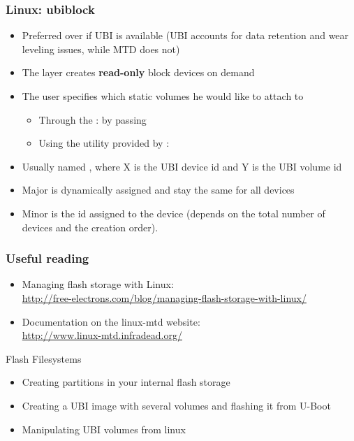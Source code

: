 \begin{frame}
  \frametitle{Linux: ubiblock}
  \begin{itemize}
  \item Preferred over  if UBI is available (UBI accounts
    for data retention and wear leveling issues, while MTD does not)
  \item The  layer creates {\bf read-only} block devices
    on demand
  \item The user specifies which static volumes he would like to attach
    to 
    \begin{itemize}
    \item Through the : by passing
    \item Using the  utility provided by :
    \end{itemize}

   \item Usually named , where X is the UBI device
     id and Y is the UBI volume id
   \item Major is dynamically assigned and stay the same for all
      devices
   \item Minor is the id assigned to the  device (depends on
     the total number of  devices and the creation order).
  \end{itemize}
\end{frame}

\begin{frame}
  \frametitle{Useful reading}
  \begin{itemize}
  \item Managing flash storage with Linux:\\
    \url{http://free-electrons.com/blog/managing-flash-storage-with-linux/}
  \item Documentation on the linux-mtd website:\\
    \url{http://www.linux-mtd.infradead.org/}
  \end{itemize}
\end{frame}

\setuplabframe
{Flash Filesystems}
{
  \begin{itemize}
  \item Creating partitions in your internal flash storage
  \item Creating a UBI image with several volumes and flashing it from
    U-Boot
  \item Manipulating UBI volumes from linux
  \end{itemize}
}
